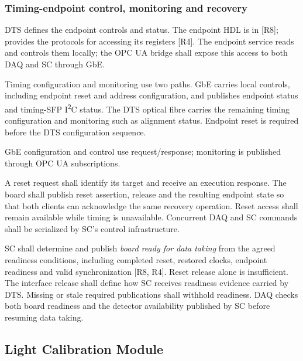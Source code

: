 \subsubsection{Timing-endpoint control, monitoring and recovery}
\label{sec:timing-recovery}

DTS defines the endpoint controls and status. The endpoint HDL is in
 [R8];  provides the protocols for accessing
its registers [R4]. The endpoint service reads and controls them locally;
the OPC UA bridge shall expose this access to both DAQ and SC through GbE.

Timing configuration and monitoring use two paths. GbE carries local controls,
including endpoint reset and address configuration, and publishes endpoint
status and timing-SFP I\textsuperscript{2}C status.
The DTS optical fibre carries the remaining timing configuration and
monitoring such as alignment status. Endpoint reset is required before the
DTS configuration sequence.

GbE configuration and control use request/response; monitoring is published
through OPC UA subscriptions.

A reset request shall identify its target and receive an execution response.
The board shall publish reset assertion, release and the resulting endpoint
state so that both clients can acknowledge the same recovery operation.
Reset access shall remain available while timing is unavailable. Concurrent
DAQ and SC commands shall be serialized by SC's control infrastructure.

SC shall determine and publish \emph{board ready for data taking} from the
agreed readiness conditions, including completed reset, restored clocks,
endpoint readiness and valid synchronization [R8, R4]. Reset release alone is
insufficient. The interface release shall define how SC receives readiness
evidence carried by DTS. Missing or stale required publications shall withhold readiness.
DAQ checks both board readiness and the detector availability published by SC
before resuming data taking.

\subsection{Light Calibration Module}
\label{sec:services-calibration}

